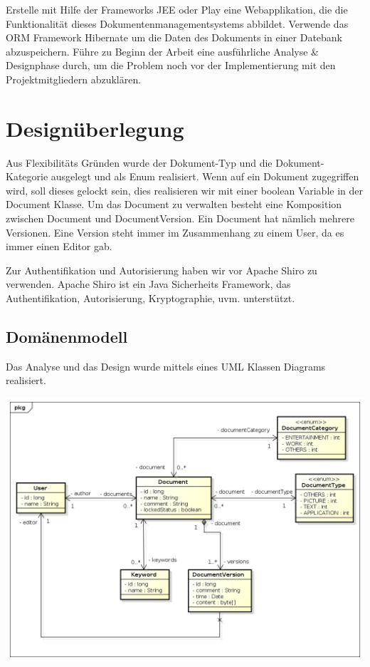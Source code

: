 \documentclass[11pt, a4paper]{article}
\begin{document}
Erstelle mit Hilfe der Frameworks JEE oder Play eine Webapplikation, die die Funktionalität dieses Dokumentenmanagementsystems abbildet. Verwende das ORM Framework Hibernate um die Daten des Dokuments in einer Datebank abzuspeichern. Führe zu Beginn der Arbeit eine ausführliche Analyse \& Designphase durch, um die Problem noch vor der Implementierung mit den Projektmitgliedern abzuklären.

\section{Designüberlegung}

Aus Flexibilitäts Gründen wurde der Dokument-Typ und die Dokument-Kategorie ausgelegt und als Enum realisiert. Wenn auf ein Dokument zugegriffen wird,
soll dieses gelockt sein, dies realisieren wir mit einer boolean Variable in der Document Klasse. Um das Document zu verwalten besteht eine Komposition zwischen Document und DocumentVersion. Ein Document hat nämlich mehrere Versionen. Eine Version steht immer im Zusammenhang zu einem User, da es immer einen Editor gab.

Zur Authentifikation und Autorisierung haben wir vor Apache Shiro zu verwenden. Apache Shiro ist ein Java Sicherheits Framework, das Authentifikation, Autorisierung,
Kryptographie, uvm. unterstützt.

\subsection{Domänenmodell}
Das Analyse und das Design wurde mittels eines UML Klassen Diagrams realisiert.

\includegraphics[width=\textwidth]{pic/dms-begin}
\end{document}
